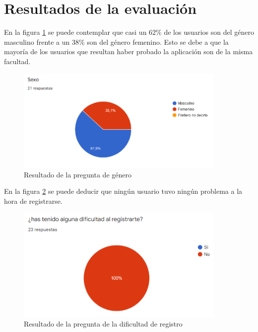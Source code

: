 
\section{Resultados de la evaluación}
En la figura \ref{fig:grafico_1} se puede contemplar que casi un 62\% de los usuarios son del género masculino frente a un 38\% son del género femenino. Esto se debe a que la mayoría de los usuarios que resultan haber probado la aplicación son de la misma facultad.

\begin{figure}[H]
    \centering
    \includegraphics[width=0.9\textwidth]{Images/Capitulo8/Capitulo8.2/grafico1.png}
    \caption{Resultado de la pregunta de género}
    \label{fig:grafico_1}
\end{figure}

En la figura \ref{fig:grafico_2} se puede deducir que ningún usuario tuvo ningún problema a la hora de registrarse.

\begin{figure}[H]
    \centering
    \includegraphics[width=0.9\textwidth]{Images/Capitulo8/Capitulo8.2/grafico2.png}
    \caption{Resultado de la pregunta de la dificultad de registro}
    \label{fig:grafico_2}
\end{figure}

